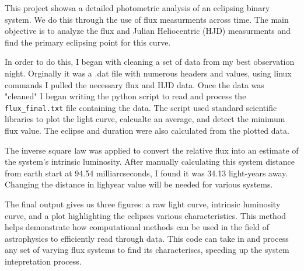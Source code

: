 This project showsa a detailed photometric analysis of an eclipsing binary system. We do this 
through the use of flux measurments across time. The main objective is to analyze the flux and 
Julian Heliocentric (HJD) measurments and find the primary eclipsing point for this curve.

In order to do this, I began with cleaning a set of data from my best observation night. Orginally
it was a .dat file with numerous headers and values, using linux commands I pulled the necessary
flux and HJD data. Once the data was "cleaned" I began writing the python script to read and
process the \texttt{flux\_final.txt} file containing the data. The script used standard scientific 
libraries to plot the light curve, calcualte an average, and detect the minimum flux value. The 
eclipse and duration were also calculated from the plotted data.

The inverse square law was applied to convert the relative flux into an estimate of the system's
intrinsic luminosity. After manually calculating this system distance from earth start at 
94.54 milliarcseconds, I found it was 34.13 light-years away. Changing the distance in lighyear value 
will be needed for various systems. 

The final output gives us three figures: a raw light curve, intrinsic luminosity curve, and a plot
highlighting the eclipses various characteristics. This method helps demonstrate how computational
methods can be used in the field of astrophysics to efficiently read through data. This code can 
take in and process any set of varying flux systems to find its characteriscs, speeding up 
the system intepretation process.  
